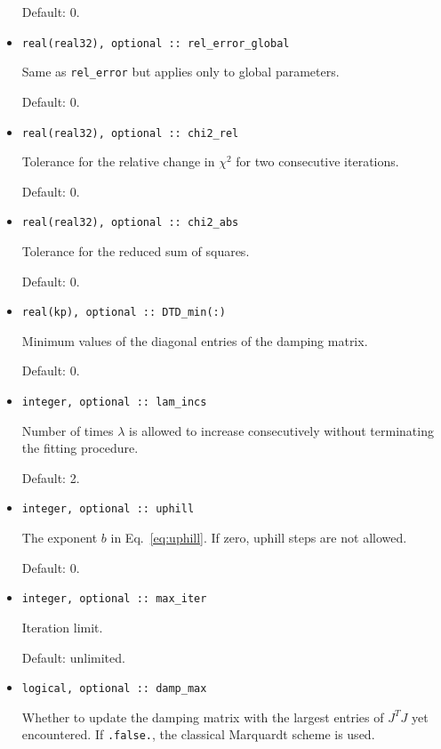 \documentclass{article}
\begin{document}
\begin{itemize}
  Default: 0.
\item 
\begin{verbatim}
real(real32), optional :: rel_error_global
\end{verbatim}
  Same as \verb+rel_error+ but applies only to global parameters.

  Default: 0.
\item 
\begin{verbatim}
real(real32), optional :: chi2_rel
\end{verbatim}
  Tolerance for the relative change in $\chi^2$ for two consecutive iterations.

  Default: 0.
\item 
\begin{verbatim}
real(real32), optional :: chi2_abs
\end{verbatim}
  Tolerance for the reduced sum of squares.

  Default: 0.
\item 
\begin{verbatim}
real(kp), optional :: DTD_min(:)
\end{verbatim}
  Minimum values of the diagonal entries of the damping matrix.

  Default: 0.
\item 
\begin{verbatim}
integer, optional :: lam_incs
\end{verbatim}
  Number of times $\lambda$ is allowed to increase consecutively without terminating the fitting procedure.

  Default: 2.
\item 
\begin{verbatim}
integer, optional :: uphill
\end{verbatim}
  The exponent $b$ in Eq.~\eqref{eq:uphill}. If zero, uphill steps are not allowed.

  Default: 0.
\item 
\begin{verbatim}
integer, optional :: max_iter
\end{verbatim}
  Iteration limit.

  Default: unlimited.
\item 
\begin{verbatim}
logical, optional :: damp_max
\end{verbatim}
  Whether to update the damping matrix with the largest entries of $J^TJ$ yet encountered. If \texttt{.false.}, the classical Marquardt scheme is used.


\end{itemize}
\end{document}
